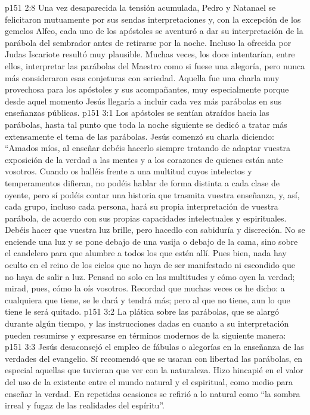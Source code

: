 \vs p151 2:8 Una vez desaparecida la tensión acumulada, Pedro y Natanael se felicitaron mutuamente por sus sendas interpretaciones y, con la excepción de los gemelos Alfeo, cada uno de los apóstoles se aventuró a dar su interpretación de la parábola del sembrador antes de retirarse por la noche. Incluso la ofrecida por Judas Iscariote resultó muy plausible. Muchas veces, los doce intentarían, entre ellos, interpretar las parábolas del Maestro como si fuese una alegoría, pero nunca más consideraron esas conjeturas con seriedad. Aquella fue una charla muy provechosa para los apóstoles y sus acompañantes, muy especialmente porque desde aquel momento Jesús llegaría a incluir cada vez más parábolas en sus enseñanzas públicas.
\vs p151 3:1 Los apóstoles se sentían atraídos hacia las parábolas, hasta tal punto que toda la noche siguiente se dedicó a tratar más extensamente el tema de las parábolas. Jesús comenzó su charla diciendo: “Amados míos, al enseñar debéis hacerlo siempre tratando de adaptar vuestra exposición de la verdad a las mentes y a los corazones de quienes están ante vosotros. Cuando os halléis frente a una multitud cuyos intelectos y temperamentos difieran, no podéis hablar de forma distinta a cada clase de oyente, pero sí podéis contar una historia que trasmita vuestra enseñanza, y, así, cada grupo, incluso cada persona, hará su propia interpretación de vuestra parábola, de acuerdo con sus propias capacidades intelectuales y espirituales. Debéis hacer que vuestra luz brille, pero hacedlo con sabiduría y discreción. No se enciende una luz y se pone debajo de una vasija o debajo de la cama, sino sobre el candelero para que alumbre a todos los que estén allí. Pues bien, nada hay oculto en el reino de los cielos que no haya de ser manifestado ni escondido que no haya de salir a luz. Pensad no solo en las multitudes y cómo oyen la verdad; mirad, pues, cómo la oís vosotros. Recordad que muchas veces os he dicho: a cualquiera que tiene, se le dará y tendrá más; pero al que no tiene, aun lo que tiene le será quitado.
\vs p151 3:2 \pc La plática sobre las parábolas, que se alargó durante algún tiempo, y las instrucciones dadas en cuanto a su interpretación pueden resumirse y expresarse en términos modernos de la siguiente manera:
\vs p151 3:3 Jesús desaconsejó el empleo de fábulas o alegorías en la enseñanza de las verdades del evangelio. Sí recomendó que se usaran con libertad las parábolas, en especial aquellas que tuvieran que ver con la naturaleza. Hizo hincapié en el valor del uso de la  existente entre el mundo natural y el espiritual, como medio para enseñar la verdad. En repetidas ocasiones se refirió a lo natural como “la sombra irreal y fugaz de las realidades del espíritu”.
